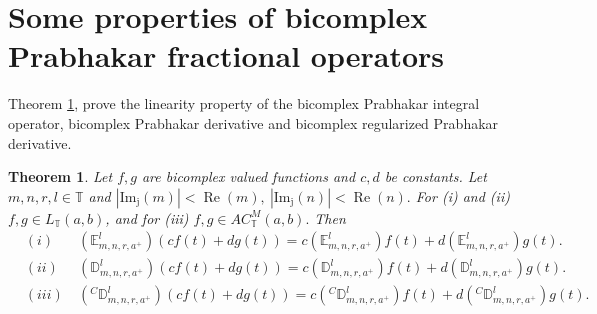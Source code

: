 \documentclass[a4paper,12pt]{article}
\newtheorem{theorem}{Theorem}[section]
\theoremstyle{remark}
\begin{document}
\section{Some properties of bicomplex  Prabhakar fractional operators}
Theorem \ref{th:learity1}, prove the linearity property of the bicomplex Prabhakar integral operator, bicomplex Prabhakar derivative and bicomplex regularized Prabhakar derivative. 
\begin{theorem}\label{th:learity1}
Let $f,g$ %
are  bicomplex valued functions and $c,d$ be  constants. Let $m,n,r,l \in \mathbb{T}$ %
and 
$|\operatorname{Im_j}(m)|<\operatorname{Re}(m),~|\operatorname{Im_j}(n)|<\operatorname{Re}(n).$ For (i) and (ii)  $f,g\in L_{\mathbb{T}}(a,b)$, and for (iii)  $f,g\in AC_\mathbb{T}^M(a,b).$%
  Then  
\begin{eqnarray}
&	(i)~ &	(\mathbb{E}_{m,n,r,a^+}^l)(c f(t)+dg(t)) =	c(\mathbb{E}_{m,n,r,a^+}^l) f(t)+	d(\mathbb{E}_{m,n,r,a^+}^l)g(t).\\
&  (ii)~	&(\mathbb{D}_{m,n,r,a^+}^l )(cf(t)+dg(t))=c(\mathbb{D}_{m,n,r,a^+}^l )f(t)+d(\mathbb{D}_{m,n,r,a^+}^l )g(t).  \\
& (iii)~	&(^C\mathbb{D}_{m,n,r,a^+}^l )(cf(t)+dg(t))=c(^C\mathbb{D}_{m,n,r,a^+}^l )f(t)+d(^C\mathbb{D}_{m,n,r,a^+}^l )g(t). 
\end{eqnarray}

\end{theorem}
\end{document}
